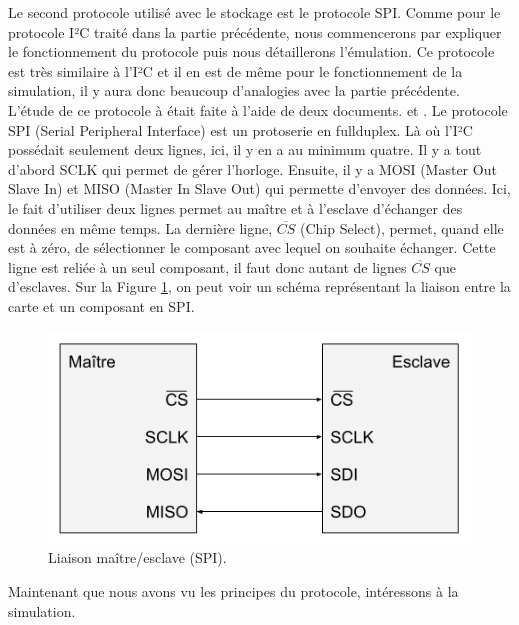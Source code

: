 \documentclass[a4paper]{article}
\begin{document}
Le second protocole utilisé avec le stockage est le protocole SPI. Comme pour le
protocole I²C traité dans la partie précédente, nous commencerons par expliquer
le fonctionnement du protocole puis nous détaillerons l'émulation. Ce protocole
est très similaire à l'I²C et il en est de même pour le fonctionnement de la
simulation, il y aura donc beaucoup d'analogies avec la partie précédente.\\

L'étude de ce protocole à était faite à l'aide de deux documents.
\cite{dhaker2018introduction} et \cite{li2014design}. Le protocole SPI (Serial
Peripheral Interface) est un \gls{protoserie} en \gls{fullduplex}. Là où l'I²C
possédait seulement deux lignes, ici, il y en a au minimum quatre. Il y a tout
d'abord SCLK qui permet de gérer l'horloge. Ensuite, il y a MOSI (Master Out
Slave In) et MISO (Master In Slave Out) qui permette d'envoyer des données. Ici,
le fait d'utiliser deux lignes permet au maître et à l'esclave d'échanger des
données en même temps. La dernière ligne, $\overline{CS}$ (Chip Select), permet,
quand elle est à zéro, de sélectionner le composant avec lequel on souhaite
échanger. Cette ligne est reliée à un seul composant, il faut donc autant de
lignes $\overline{CS}$ que d'esclaves. Sur la Figure \ref{fig:schemaspi}, on
peut voir un schéma représentant la liaison entre la carte et un composant en
SPI.

\begin{figure}[h!]
  \begin{center}
    \includegraphics[scale=0.6]{./img/schema-spi.png}
    \caption{Liaison maître/esclave (SPI).}
    \label{fig:schemaspi}
  \end{center}
\end{figure}

Maintenant que nous avons vu les principes du protocole, intéressons à la
simulation.
\end{document}
